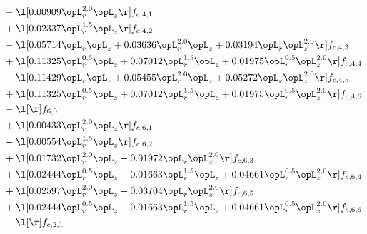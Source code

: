 \begin{alignat}{2}
& - \l[  0.00909 \opL_r^{2.0} \opL_z  \r] f_{c,4,1} \nonumber \\ 
& + \l[  0.02337 \opL_r^{1.5} \opL_z  \r] f_{c,4,2} \nonumber \\ 
& - \l[  0.05714 \opL_r \opL_z +  0.03636 \opL_r^{2.0} \opL_z +  0.03194 \opL_r \opL_z^{2.0}  \r] f_{c,4,3} \nonumber \\ 
& + \l[  0.11325 \opL_r^{0.5} \opL_z +  0.07012 \opL_r^{1.5} \opL_z +  0.01975 \opL_r^{0.5} \opL_z^{2.0}  \r] f_{c,4,4} \nonumber \\ 
& - \l[  0.11429 \opL_r \opL_z +  0.05455 \opL_r^{2.0} \opL_z +  0.05272 \opL_r \opL_z^{2.0}  \r] f_{c,4,5} \nonumber \\ 
& + \l[  0.11325 \opL_r^{0.5} \opL_z +  0.07012 \opL_r^{1.5} \opL_z +  0.01975 \opL_r^{0.5} \opL_z^{2.0}  \r] f_{c,4,6} \nonumber \\ 
& - \l[  \r] f_{6,0} \nonumber \\ 
& + \l[  0.00433 \opL_r^{2.0} \opL_z  \r] f_{c,6,1} \nonumber \\ 
& - \l[  0.00554 \opL_r^{1.5} \opL_z  \r] f_{c,6,2} \nonumber \\ 
& + \l[  0.01732 \opL_r^{2.0} \opL_z   -0.01972 \opL_r \opL_z^{2.0}  \r] f_{c,6,3} \nonumber \\ 
& + \l[  0.02444 \opL_r^{0.5} \opL_z   -0.01663 \opL_r^{1.5} \opL_z +  0.04661 \opL_r^{0.5} \opL_z^{2.0}  \r] f_{c,6,4} \nonumber \\ 
& + \l[  0.02597 \opL_r^{2.0} \opL_z   -0.03704 \opL_r \opL_z^{2.0}  \r] f_{c,6,5} \nonumber \\ 
& + \l[  0.02444 \opL_r^{0.5} \opL_z   -0.01663 \opL_r^{1.5} \opL_z +  0.04661 \opL_r^{0.5} \opL_z^{2.0}  \r] f_{c,6,6} \nonumber \\ 
& - \l[  \r] f_{c,2,1} \nonumber \\ 
\end{alignat} 


